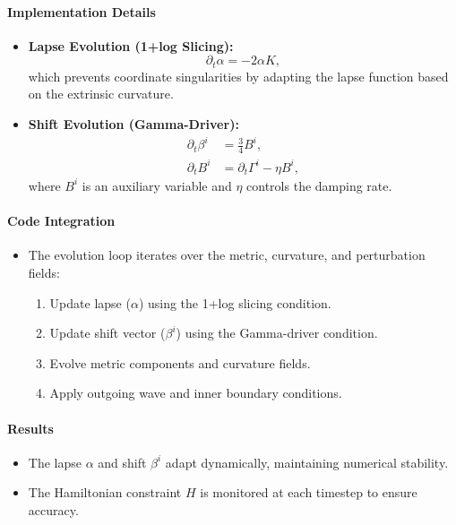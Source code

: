 \documentclass[12pt]{article}
\begin{document}
\paragraph{Implementation Details}
\begin{itemize}
    \item \textbf{Lapse Evolution (1+log Slicing):}
    \[
    \partial_t \alpha = -2 \alpha K,
    \]
    which prevents coordinate singularities by adapting the lapse function based on the extrinsic curvature.
    \item \textbf{Shift Evolution (Gamma-Driver):}
    \begin{align*}
    \partial_t \beta^i &= \frac{3}{4} B^i, \\
    \partial_t B^i &= \partial_t \Gamma^i - \eta B^i,
    \end{align*}
    where $B^i$ is an auxiliary variable and $\eta$ controls the damping rate.
\end{itemize}

\paragraph{Code Integration}
\begin{itemize}
    \item The evolution loop iterates over the metric, curvature, and perturbation fields:
    \begin{enumerate}
        \item Update lapse ($\alpha$) using the 1+log slicing condition.
        \item Update shift vector ($\beta^i$) using the Gamma-driver condition.
        \item Evolve metric components and curvature fields.
        \item Apply outgoing wave and inner boundary conditions.
    \end{enumerate}
\end{itemize}

\paragraph{Results}
\begin{itemize}
    \item The lapse $\alpha$ and shift $\beta^i$ adapt dynamically, maintaining numerical stability.
    \item The Hamiltonian constraint $H$ is monitored at each timestep to ensure accuracy.
\end{itemize}
\end{document}
